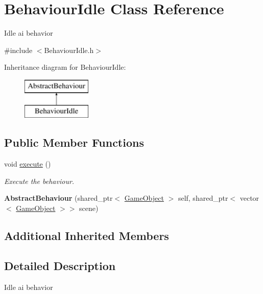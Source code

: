 \hypertarget{class_behaviour_idle}{}\section{Behaviour\+Idle Class Reference}
\label{class_behaviour_idle}


Idle ai behavior  




{\ttfamily \#include $<$Behaviour\+Idle.\+h$>$}

Inheritance diagram for Behaviour\+Idle\+:\begin{figure}[H]
\begin{center}
\leavevmode
\includegraphics[height=2.000000cm]{class_behaviour_idle}
\end{center}
\end{figure}
\subsection*{Public Member Functions}
\begin{DoxyCompactItemize}
\item 
void \mbox{\hyperlink{class_behaviour_idle_ac810c315b1ea41772060b216ecdc2e11}{execute}} ()
\begin{DoxyCompactList}\small\item\em Execute the behaviour. \end{DoxyCompactList}\item 
\mbox{\label{class_behaviour_idle_a8a3a9217b3179f949a1d6a32f340c00c}} 
{\bfseries Abstract\+Behaviour} (shared\+\_\+ptr$<$ \mbox{\hyperlink{class_game_object}{Game\+Object}} $>$ self, shared\+\_\+ptr$<$ vector$<$ \mbox{\hyperlink{class_game_object}{Game\+Object}} $>$$>$ scene)
\end{DoxyCompactItemize}
\subsection*{Additional Inherited Members}


\subsection{Detailed Description}
Idle ai behavior 



